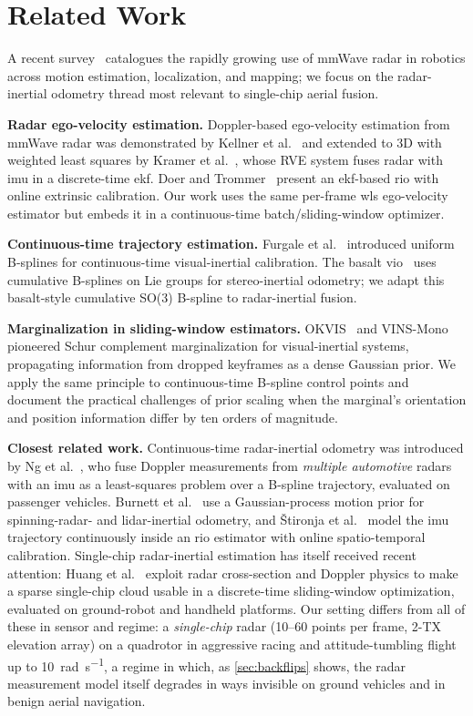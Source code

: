 \section{Related Work}
\label{sec:related}

A recent survey~\cite{harlow2024survey} catalogues the rapidly growing use
of mmWave radar in robotics across motion estimation, localization, and
mapping; we focus on the radar-inertial odometry thread most relevant to
single-chip aerial fusion.

\textbf{Radar ego-velocity estimation.}
Doppler-based ego-velocity estimation from mmWave radar was
demonstrated by Kellner et al.~\cite{kellner2014instantaneous} and
extended to 3D with weighted least squares by
Kramer et al.~\cite{kramer2020rve}, whose RVE system fuses radar
with \ac{imu} in a discrete-time \ac{ekf}.  Doer and
Trommer~\cite{doer2020ekf} present an \ac{ekf}-based \ac{rio} with online
extrinsic calibration. Our work uses the same per-frame \ac{wls}
ego-velocity estimator but embeds it in a continuous-time
batch/sliding-window optimizer.

\textbf{Continuous-time trajectory estimation.}
Furgale et al.~\cite{furgale2013unified} introduced uniform B-splines
for continuous-time visual-inertial calibration.  The basalt
\ac{vio}~\cite{usenko2020basalt} uses cumulative B-splines on Lie groups
for stereo-inertial odometry; we adapt this basalt-style
cumulative SO(3) B-spline to radar-inertial fusion.

\textbf{Marginalization in sliding-window estimators.}
OKVIS~\cite{leutenegger2015keyframe} and
VINS-Mono~\cite{qin2018vins} pioneered Schur complement
marginalization for visual-inertial systems, propagating information
from dropped keyframes as a dense Gaussian prior. We apply the same
principle to continuous-time B-spline control points and document
the practical challenges of prior scaling when the marginal's
orientation and position information differ by ten orders of magnitude.

\textbf{Closest related work.}
Continuous-time radar-inertial odometry was introduced by
Ng et al.~\cite{ng2021ctrio}, who fuse Doppler measurements from
\emph{multiple automotive} radars with an \ac{imu} as a least-squares
problem over a B-spline trajectory, evaluated on passenger vehicles.
Burnett et al.~\cite{burnett2024gp} use a Gaussian-process motion
prior for spinning-radar- and lidar-inertial odometry, and
\v{S}tironja et al.~\cite{stironja2026rio} model the \ac{imu} trajectory
continuously inside an \ac{rio} estimator with online spatio-temporal
calibration.  Single-chip radar-inertial estimation has itself
received recent attention: Huang et al.~\cite{huang2024lessismore}
exploit radar cross-section and Doppler physics to make a sparse
single-chip cloud usable in a discrete-time sliding-window
optimization, evaluated on ground-robot and handheld platforms.
Our setting differs from all of these in sensor and
regime: a \emph{single-chip} radar (10--60 points per frame,
2-TX elevation array) on a quadrotor in aggressive racing and
attitude-tumbling flight up to \SI{10}{\radian\per\second}, a
regime in which, as \autoref{sec:backflips} shows, the radar
measurement model itself degrades in ways invisible on ground
vehicles and in benign aerial navigation.

